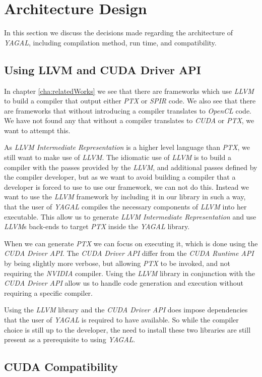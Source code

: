 \section{Architecture Design}
In this section we discuss the decisions made regarding the architecture of \textit{YAGAL}, including compilation method, run time, and compatibility.

\subsection{Using LLVM and CUDA Driver API}
In chapter \ref{cha:relatedWorks} we see that there are frameworks which use \textit{LLVM} to build a compiler that output either \textit{PTX} or \textit{SPIR} code. We also see that there are frameworks that without introducing a compiler translates to \textit{OpenCL} code. We have not found any that without a compiler translates to \textit{CUDA} or \textit{PTX}, we want to attempt this.

As \textit{LLVM Intermediate Representation} is a higher level language than \textit{PTX}, we still want to make use of \textit{LLVM}. The idiomatic use of \textit{LLVM} is to build a compiler with the passes provided by the \textit{LLVM}, and additional passes defined by the compiler developer, but as we want to avoid building a compiler that a developer is forced to use to use our framework, we can not do this. Instead we want to use the \textit{LLVM} framework by including it in our library in such a way, that the user of \textit{YAGAL} compiles the necessary components of \textit{LLVM} into her executable. This allow us to generate \textit{LLVM Intermediate Representation} and use \textit{LLVM}s back-ends to target \textit{PTX} inside the \textit{YAGAL} library.

When we can generate \textit{PTX} we can focus on executing it, which is done using the \textit{CUDA Driver API}. The \textit{CUDA Driver API} differ from the \textit{CUDA Runtime API} by being slightly more verbose, but allowing \textit{PTX} to be invoked, and not requiring the \textit{NVIDIA} compiler. Using the \textit{LLVM} library in conjunction with the \textit{CUDA Driver API} allow us to handle code generation and execution without requiring a specific compiler.

Using the \textit{LLVM} library and the \textit{CUDA Driver API} does impose dependencies that the user of \textit{YAGAL} is required to have available. So while the compiler choice is still up to the developer, the need to install these two libraries are still present as a prerequisite to using \textit{YAGAL}.

\subsection{CUDA Compatibility}
